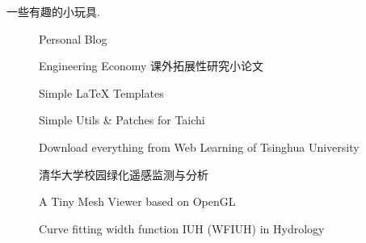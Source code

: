 

一些有趣的小玩具.

\begin{description}
  \item[] Personal Blog
  \item[] Engineering Economy 课外拓展性研究小论文
  \item[] Simple \LaTeX{} Templates
  \item[] Simple Utils \& Patches for Taichi
  \item[] Download everything from Web Learning of Tsinghua University
  \item[] 清华大学校园绿化遥感监测与分析
  \item[] A Tiny Mesh Viewer based on OpenGL
  \item[] Curve fitting width function IUH (WFIUH) in Hydrology
\end{description}
